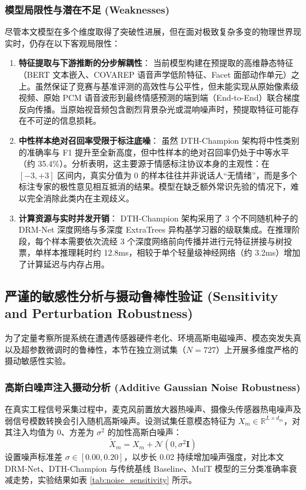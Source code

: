 \subsubsection{模型局限性与潜在不足 (Weaknesses)}
尽管本文模型在多个维度取得了突破性进展，但在面对极致复杂多变的物理世界现实时，仍存在以下客观局限性：
\begin{enumerate}
    \item \textbf{特征提取与下游推断的分步解耦性}：
    当前模型构建在预提取的高维静态特征（BERT 文本嵌入、COVAREP 语音声学低阶特征、Facet 面部动作单元）之上。虽然保证了竞赛与基准评测的高效性与公平性，但未能实现从原始像素级视频、原始 PCM 语音波形到最终情感预测的端到端（End-to-End）联合梯度反向传播。当原始视音频包含剧烈背景杂光或混响噪声时，预提取特征可能存在不可逆的信息损耗。

    \item \textbf{中性样本绝对召回率受限于标注底噪}：
    虽然 DTH-Champion 架构将中性类别的准确率与 F1 提升至全新高度，但中性样本的绝对召回率仍处于中等水平（约 35.4\%）。分析表明，这主要源于情感标注协议本身的主观性：在 $[-3, +3]$ 区间内，真实分值为 0 的样本往往并非说话人“无情绪”，而是多个标注专家的极性意见相互抵消的结果。模型在缺乏额外常识先验的情况下，难以完全消除此类内在主观歧义。

    \item \textbf{计算资源与实时并发开销}：
    DTH-Champion 架构采用了 3 个不同随机种子的 DRM-Net 深度网络与多深度 ExtraTrees 异构基学习器的级联集成。在推理阶段，每个样本需要依次流经 3 个深度网络前向传播并进行元特征拼接与树投票，单样本推理耗时约 12.8ms，相较于单个轻量级神经网络（约 3.2ms）增加了计算延迟与内存占用。
\end{enumerate}

\clearpage

\subsection{严谨的敏感性分析与摄动鲁棒性验证 (Sensitivity and Perturbation Robustness)}
为了定量考察所提系统在遭遇传感器硬件老化、环境高斯电磁噪声、模态突发失真以及超参数微调时的鲁棒性，本节在独立测试集（$N=727$）上开展多维度严格的摄动敏感性实验。

\subsubsection{高斯白噪声注入摄动分析 (Additive Gaussian Noise Robustness)}
在真实工程信号采集过程中，麦克风前置放大器热噪声、摄像头传感器热电噪声及弱信号模数转换会引入随机高斯噪声。设测试集任意模态特征为 $X_m \in \mathbb{R}^{L \times d_m}$，对其注入均值为 0、方差为 $\sigma^2$ 的加性高斯白噪声：
\begin{equation}
\tilde{X}_m = X_m + \mathcal{N}(0, \sigma^2 \mathbf{I})
\end{equation}
设置噪声标准差 $\sigma \in [0.00, 0.20]$，以步长 0.02 持续增加噪声强度，对比本文 DRM-Net、DTH-Champion 与传统基线 Baseline、MulT 模型的三分类准确率衰减走势，实验结果如表 \ref{tab:noise_sensitivity} 所示。

